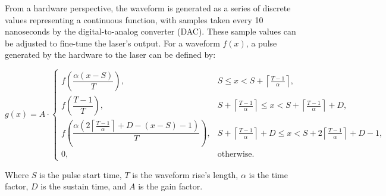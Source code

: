 From a hardware perspective, the waveform is generated as a series of discrete values representing a continuous function, with samples taken every 10 nanoseconds by the digital-to-analog converter (DAC). These sample values can be adjusted to fine-tune the laser's output. For a waveform $f(x)$, a pulse generated by the hardware to the laser can be defined by:

\begin{equation}
g(x) = A \cdot 
\begin{cases} 
f\left(\dfrac{\alpha(x - S)}{T}\right), & \!\!\! S \leq x < S + \left\lceil \frac{T-1}{\alpha} \right\rceil, \\[8pt]
f\left(\dfrac{T-1}{T}\right), & \!\!\! S + \left\lceil \frac{T-1}{\alpha} \right\rceil \leq x < S + \left\lceil \frac{T-1}{\alpha} \right\rceil + D, \\[8pt]
f\left(\dfrac{\alpha\left(2\left\lceil \frac{T-1}{\alpha} \right\rceil + D - (x - S) - 1\right)}{T}\right), & \!\!\! S + \left\lceil \frac{T-1}{\alpha} \right\rceil + D \leq x < S + 2\left\lceil \frac{T-1}{\alpha} \right\rceil + D - 1, \\[8pt]
0, & \!\!\! \text{otherwise}.
\end{cases}
\end{equation}



Where $S$ is the pulse start time, $T$ is the waveform rise's length, $\alpha$ is the time factor, $D$ is the sustain time, and $A$ is the gain factor.